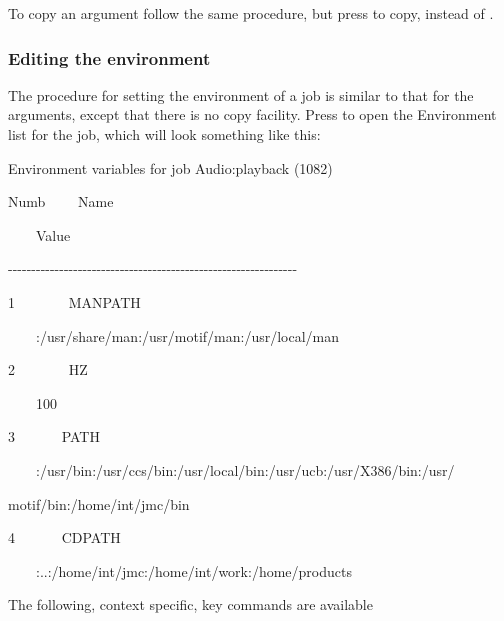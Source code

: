 To copy an argument follow the same procedure, but press  to copy, instead of .

\subsubsection{Editing the environment}
The procedure for setting the environment of a job is similar to that
for the arguments, except that there is no copy facility. Press
 to open the Environment list for the job,
which will look something like this:

\pagebreak[20]
\begin{exparasmall}

Environment variables for job
{\textasciigrave}Audio:playback{\textquotesingle} (1082)

Numb \ \ \ \ Name

\ \ \ \ Value

{}-{}-{}-{}-{}-{}-{}-{}-{}-{}-{}-{}-{}-{}-{}-{}-{}-{}-{}-{}-{}-{}-{}-{}-{}-{}-{}-{}-{}-{}-{}-{}-{}-{}-{}-{}-{}-{}-{}-{}-{}-{}-{}-{}-{}-{}-{}-{}-{}-{}-{}-{}-{}-{}-{}-{}-{}-{}-{}-{}-{}-{}-

1 \ \ \ \ \ \ \ MANPATH

\ \ \ \ :/usr/share/man:/usr/motif/man:/usr/local/man

2 \ \ \ \ \ \ \ HZ

\ \ \ \ 100

3 \ \ \ \ \ \ PATH

\ \ \ \ :/usr/bin:/usr/ccs/bin:/usr/local/bin:/usr/ucb:/usr/X386/bin:/usr/

motif/bin:/home/int/jmc/bin

4 \ \ \ \ \ \ CDPATH

\ \ \ \ :..:/home/int/jmc:/home/int/work:/home/products

\end{exparasmall}

The following, context specific, key commands are available


